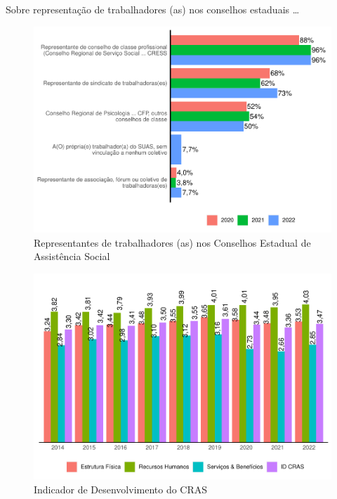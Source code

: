 \documentclass[
  brazilian]{report}
\begin{document}
Sobre representação de trabalhadores (as) nos conselhos estaduais
\ldots{}

\begin{figure}
\includegraphics{Censo-SUAS-2022_files/figure-latex/trab_rep-1} \caption[Representantes de trabalhadores (as) nos Conselhos Estadual de Assistência Social]{Representantes de trabalhadores (as) nos Conselhos Estadual de Assistência Social}\label{fig:trab_rep}
\end{figure}

\begin{figure}
\includegraphics{Censo-SUAS-2022_files/figure-latex/idcras-1} \caption[Indicador de Desenvolvimento do CRAS]{Indicador de Desenvolvimento do CRAS}\label{fig:idcras}
\end{figure}
\end{document}
